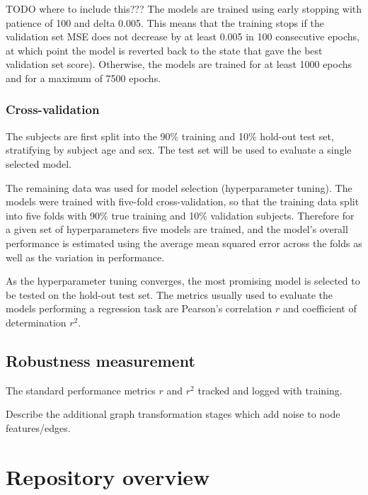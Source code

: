 TODO where to include this??? The models are trained using early stopping with patience of 100 and delta 0.005. This means that the training stops if the validation set MSE does not decrease by at least 0.005 in 100 consecutive epochs, at which point the model is reverted back to the state that gave the best validation set score). Otherwise, the models are trained for at least 1000 epochs and for a maximum of 7500 epochs.

\subsubsection{Cross-validation}
The subjects are first split into the 90\% training and 10\% hold-out test set, stratifying by subject age and sex. The test set will be used to evaluate a single selected model. 

The remaining data was used for model selection (hyperparameter tuning). The models were trained with five-fold cross-validation, so that the training data split into five folds with 90\% true training and 10\% validation subjects. Therefore for a given set of hyperparameters five models are trained, and the model's overall performance is estimated using the average mean squared error across the folds as well as the variation in performance. 

As the hyperparameter tuning converges, the most promising model is selected to be tested on the hold-out test set. The metrics usually used to evaluate the models performing a regression task are Pearson's correlation $r$ and coefficient of determination $r^2$.

\subsection{Robustness measurement}


The standard performance metrics $r$ and $r^2$ tracked and logged with training.

Describe the additional graph transformation stages which add noise to node features/edges.


\section{Repository overview}


